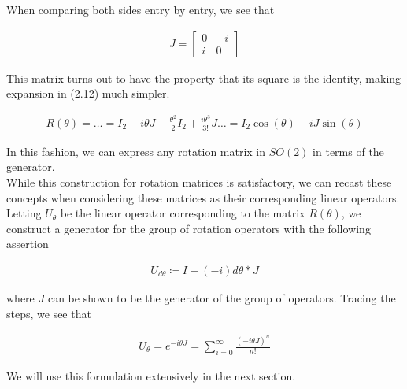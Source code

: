 \documentclass[10pt]{ucthesis}
\begin{document}
When comparing both sides entry by entry, we see that 

\begin{equation}
	\begin{aligned}
		J = \begin{bmatrix}
			0 & -i \\
			i & 0
		\end{bmatrix}
	\end{aligned}
\end{equation}

This matrix turns out to have the property that its square is the identity, making expansion in (2.12) much simpler.

\begin{equation}
	\begin{aligned}
		R(\theta) = \hdots = I_2 -i\theta J - \frac{\theta^2}{2} I_2 + \frac{i\theta^3}{3!}J \hdots = I_2 \cos(\theta) -iJ \sin(\theta) 
	\end{aligned}
\end{equation}

In this fashion, we can express any rotation matrix in $SO(2)$ in terms of the generator. \\

While this construction for rotation matrices is satisfactory, we can recast these concepts when considering these matrices as their corresponding linear operators. Letting $U_\theta$ be the linear operator corresponding to the matrix $R(\theta)$, we construct a generator for the group of rotation operators with the following assertion

\begin{equation}
	\begin{aligned}
		U_{d\theta} \coloneq I + (-i)d\theta * J
	\end{aligned}
\end{equation}  

\noindent where $J$ can be shown to be the generator of the group of operators. Tracing the steps, we see that 

\begin{equation}
	\begin{aligned}
		U_\theta = e^{-i\theta J} = \sum_{i=0}^\infty \frac{(-i\theta J)^n}{n!}
	\end{aligned}
\end{equation}  


We will use this formulation extensively in the next section.
\end{document}
